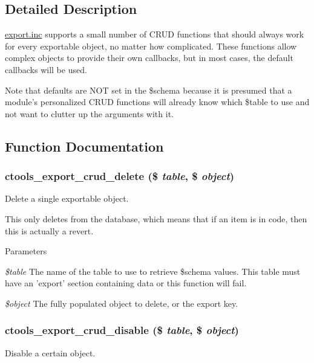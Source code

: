 \subsection{Detailed Description}
\hyperlink{export_8inc}{export.inc} supports a small number of CRUD functions that should always work for every exportable object, no matter how complicated. These functions allow complex objects to provide their own callbacks, but in most cases, the default callbacks will be used.

Note that defaults are NOT set in the \$schema because it is presumed that a module's personalized CRUD functions will already know which \$table to use and not want to clutter up the arguments with it. 

\subsection{Function Documentation}
\hypertarget{group__export__crud_gac99a2a09acebd603aeff488b24ed1362}{
\subsubsection[{ctools\_\-export\_\-crud\_\-delete}]{\setlength{\rightskip}{0pt plus 5cm}ctools\_\-export\_\-crud\_\-delete (\$ {\em table}, \/  \$ {\em object})}}
\label{group__export__crud_gac99a2a09acebd603aeff488b24ed1362}
Delete a single exportable object.

This only deletes from the database, which means that if an item is in code, then this is actually a revert.


\begin{DoxyParams}{Parameters}
\item[{\em \$table}]The name of the table to use to retrieve \$schema values. This table must have an 'export' section containing data or this function will fail. \item[{\em \$object}]The fully populated object to delete, or the export key. \end{DoxyParams}
\hypertarget{group__export__crud_ga1f0a12ff967fe1204072ff22267da14e}{
\subsubsection[{ctools\_\-export\_\-crud\_\-disable}]{\setlength{\rightskip}{0pt plus 5cm}ctools\_\-export\_\-crud\_\-disable (\$ {\em table}, \/  \$ {\em object})}}
\label{group__export__crud_ga1f0a12ff967fe1204072ff22267da14e}
Disable a certain object.


